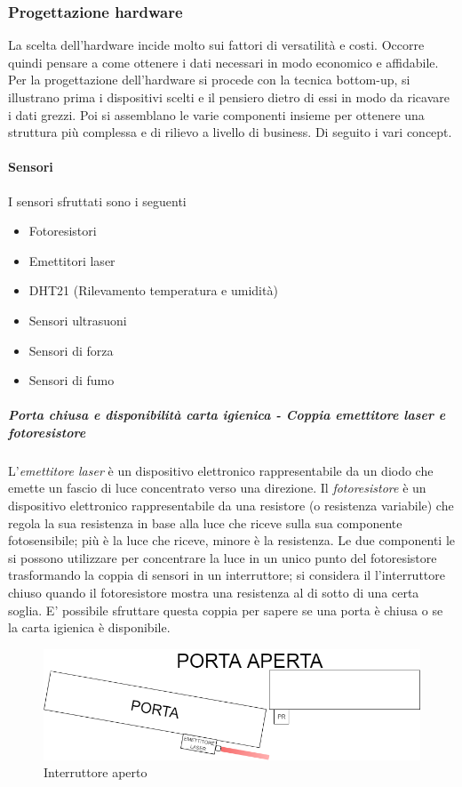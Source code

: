 \documentclass[12pt]{article}
\begin{document}
\subsubsection{Progettazione hardware}
La scelta dell'hardware incide molto sui fattori di versatilità e costi. Occorre quindi pensare a come ottenere i dati necessari in modo economico e affidabile. Per la progettazione dell'hardware si procede con la tecnica bottom-up, si illustrano prima i dispositivi scelti e il pensiero dietro di essi in modo da ricavare i dati grezzi. Poi si assemblano le varie componenti insieme per ottenere una struttura più complessa e di rilievo a livello di business. Di seguito i vari concept.
\paragraph{Sensori}
I sensori sfruttati sono i seguenti
\begin{itemize}
\item Fotoresistori
\item Emettitori laser
\item DHT21 (Rilevamento temperatura e umidità)
\item Sensori ultrasuoni
\item Sensori di forza
\item Sensori di fumo
\end{itemize}
\subparagraph*{Porta chiusa e disponibilità carta igienica - Coppia emettitore laser e fotoresistore}
L'\textit{emettitore laser} è un dispositivo elettronico rappresentabile da un diodo che emette un fascio di luce concentrato verso una direzione.
Il \textit{fotoresistore} è un dispositivo elettronico rappresentabile da una resistore (o resistenza variabile) che regola la sua resistenza in base alla luce che riceve sulla sua componente fotosensibile; più è la luce che riceve, minore è la resistenza.
Le due componenti le si possono utilizzare per concentrare la luce in un unico punto del fotoresistore trasformando la coppia di sensori in un interruttore; si considera il l'interruttore chiuso quando il fotoresistore mostra una resistenza al di sotto di una certa soglia.
E' possibile sfruttare questa coppia per sapere se una porta è chiusa o se la carta igienica è disponibile.
\begin{figure}[h!]
\centering
	\includegraphics[scale=0.45]{img/parteLocale/PortaAperta.png} 
    \caption{Interruttore aperto}
\end{figure}
\end{document}
